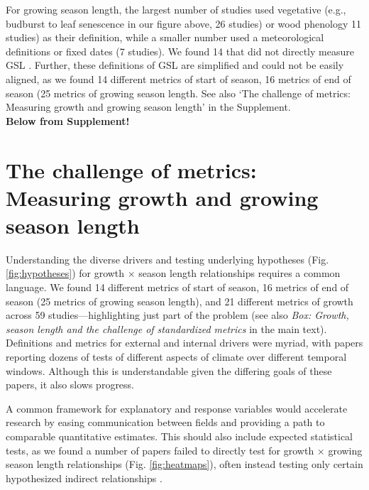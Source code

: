 \documentclass[11pt]{article}
\begin{document}
For growing season length, the largest number of studies used vegetative (e.g., budburst to leaf senescence in our figure above, 26 studies) or wood phenology 11 studies) as their definition, while a smaller number used a meteorological definitions or fixed dates (7 studies). We found 14 that did not directly measure GSL \citep[e.g.,][]{zhu2021different,dow2022warm,zohner2023effect}. Further, these definitions of GSL are simplified and could not be easily aligned, as we found 14 different metrics of start of season, 16 metrics of end of season (25 metrics of growing season length. See also `The challenge of metrics: Measuring growth and growing season length' in the Supplement. \\



{\Large {\bf Below from Supplement!}}

\section*{The challenge of metrics: Measuring growth and growing season length}

Understanding the diverse drivers and testing underlying hypotheses (Fig. \ref{fig:hypotheses}) for growth $\times$ season length relationships requires a common language. We found 14 different metrics of start of season, 16 metrics of end of season (25 metrics of growing season length), and 21 different metrics of growth across 59 studies---highlighting just part of the problem (see also \emph{Box: Growth, season length and the challenge of standardized metrics} in the main text). Definitions and metrics for external and internal drivers were myriad, %
with papers reporting dozens of tests of different aspects of climate over different temporal windows. Although this is understandable given the differing goals of these papers, it also slows progress. 

A common framework for explanatory and response variables would accelerate research by easing communication between fields and providing a path to comparable quantitative estimates. 
This should also include expected statistical tests, as we found a number of papers failed to directly test for growth $\times$ growing season length relationships (Fig. \ref{fig:heatmaps}), often instead testing only certain hypothesized indirect relationships \citep[e.g. spring temperature $\times$ growth in][]{dow2022warm}. %
\end{document}
